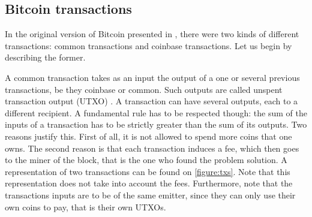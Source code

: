       \subsection{Bitcoin transactions}
        \label{subsec:txs}
        In the original version of Bitcoin presented in \cite{Bitcoin}, there  were two kinds of different transactions: common transactions and coinbase transactions. Let us begin by describing the former.
        
        A common transaction takes as an input the output of a one or several previous transactions, be they coinbase or common. Such outputs are called unspent transaction output (UTXO) \cite{Survey}. A transaction can have several outputs, each to a different recipient. A fundamental rule has to be respected though: the sum of the inputs of a transaction has to be strictly greater than the sum of its outputs. Two reasons justify this. First of all, it is not allowed to spend more coins that one owns. The second reason is that each transaction induces a fee, which then goes to the miner of the block, that is the one who found the problem solution. A representation of two transactions can be found on \autoref{figure:txs}. Note that this representation does not take into account the fees. Furthermore, note that the transactions inputs are to be of the same emitter, since they can only use their own coins to pay, that is their own UTXOs.
        
